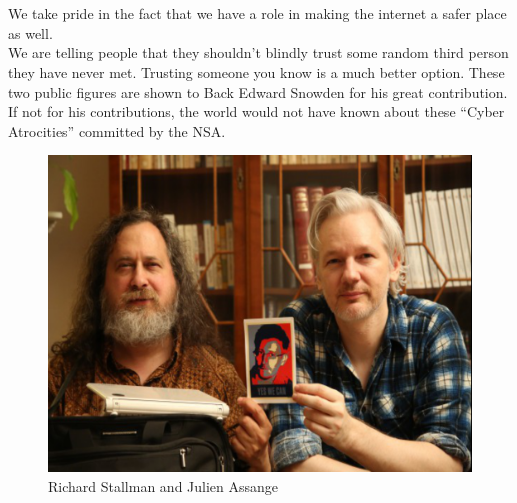 \documentclass[11pt]{book}
\begin{document}
\\\\We take pride in the fact that we have a role in making the internet a safer place as well.
\\ We are telling people that they shouldn't blindly trust some random third person they have never met. Trusting someone you know is a much better option. 
\newpage
These two public figures are shown to Back Edward Snowden for his great contribution. 
\\If not for his contributions, the world would not have known about these ``Cyber Atrocities'' committed by the NSA. 
\begin{figure}[ht!]
	\centering
	\includegraphics[width=150mm]{prism5.png}
	\caption{Richard Stallman and Julien Assange}
	\label{overflow}
\end{figure}
\newpage

\newpage
\renewcommand{\cftchapdotsep}{\cftdotsep}
\end{document}
